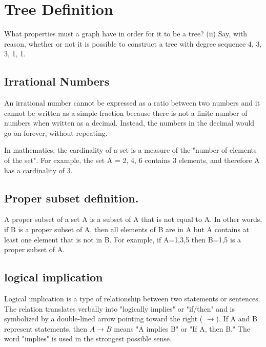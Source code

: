 \documentclass[]{report}
\begin{document}

\section{Tree Definition}
What properties must a graph have in order for it to be a
tree?
(ii) Say, with reason, whether or not it is possible to construct a tree with
degree sequence 4, 3, 3, 1, 1.
\newpage


\subsection{Irrational Numbers}
An irrational number cannot be expressed as a ratio between two numbers and it cannot be written as a simple fraction because there is not a finite number of numbers when written as a decimal. Instead, the numbers in the decimal would go on forever, without repeating.



In mathematics, the cardinality of a set is a measure of the "number of elements of the set". For example, the set A = {2, 4, 6} contains 3 elements, and therefore A has a cardinality of 3.


\subsection{Proper subset definition.} 
A proper subset of a set A is a subset of A that is not equal to A. In other words, if B is a proper subset of A, then all elements of B are in A but A contains at least one element that is not in B. For example, if A={1,3,5} then B={1,5} is a proper subset of A.

\subsection{logical implication}


Logical implication is a type of relationship between two statements or sentences. The relation translates verbally into "logically implies" or "if/then" and is symbolized by a double-lined arrow pointing toward the right ( $\rightarrow$). If A and B represent statements, then $A\rightarrow B$ means "A implies B" or "If A, then B." The word "implies" is used in the strongest possible sense.
\end{document}
